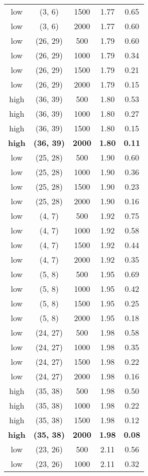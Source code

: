 \begin{tabular}{c c c c c}
low & (3, 6) &  1500 & 1.77 & 0.65 \\
low & (3, 6) &  2000 & 1.77 & 0.60 \\
low & (26, 29) &  500 & 1.79 & 0.60 \\
low & (26, 29) &  1000 & 1.79 & 0.34 \\
low & (26, 29) &  1500 & 1.79 & 0.21 \\
low & (26, 29) &  2000 & 1.79 & 0.15 \\
high & (36, 39) &  500 & 1.80 & 0.53 \\
high & (36, 39) &  1000 & 1.80 & 0.27 \\
high & (36, 39) &  1500 & 1.80 & 0.15 \\
\textbf{high} & \textbf{(36, 39)} & \textbf{ 2000} & \textbf{1.80} & \textbf{0.11} \\
low & (25, 28) &  500 & 1.90 & 0.60 \\
low & (25, 28) &  1000 & 1.90 & 0.36 \\
low & (25, 28) &  1500 & 1.90 & 0.23 \\
low & (25, 28) &  2000 & 1.90 & 0.16 \\
low & (4, 7) &  500 & 1.92 & 0.75 \\
low & (4, 7) &  1000 & 1.92 & 0.58 \\
low & (4, 7) &  1500 & 1.92 & 0.44 \\
low & (4, 7) &  2000 & 1.92 & 0.35 \\
low & (5, 8) &  500 & 1.95 & 0.69 \\
low & (5, 8) &  1000 & 1.95 & 0.42 \\
low & (5, 8) &  1500 & 1.95 & 0.25 \\
low & (5, 8) &  2000 & 1.95 & 0.18 \\
low & (24, 27) &  500 & 1.98 & 0.58 \\
low & (24, 27) &  1000 & 1.98 & 0.35 \\
low & (24, 27) &  1500 & 1.98 & 0.22 \\
low & (24, 27) &  2000 & 1.98 & 0.16 \\
high & (35, 38) &  500 & 1.98 & 0.50 \\
high & (35, 38) &  1000 & 1.98 & 0.22 \\
high & (35, 38) &  1500 & 1.98 & 0.12 \\
\textbf{high} & \textbf{(35, 38)} & \textbf{ 2000} & \textbf{1.98} & \textbf{0.08} \\
low & (23, 26) &  500 & 2.11 & 0.56 \\
low & (23, 26) &  1000 & 2.11 & 0.32 \\

\end{tabular}
